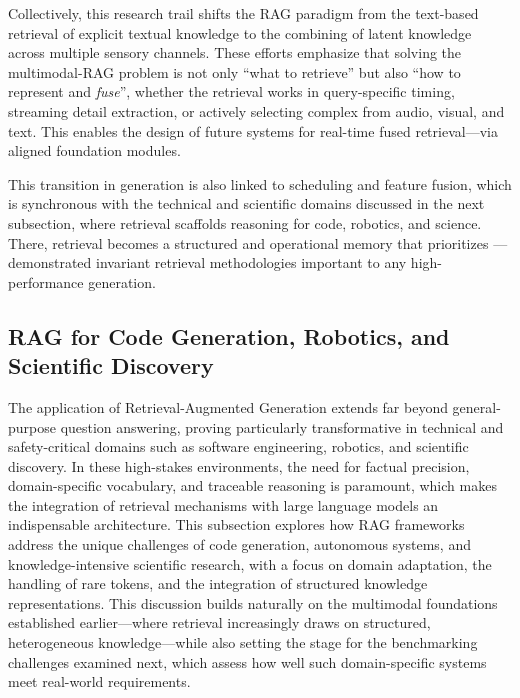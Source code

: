 \documentclass[11pt]{article}
\begin{document}
Collectively, this research trail shifts the RAG paradigm from the text-based retrieval of explicit textual knowledge to the combining of latent knowledge across multiple sensory channels. These efforts emphasize that solving the multimodal-RAG problem is not only ``what to retrieve'' but also ``how to represent and \emph{fuse}'', whether the retrieval works in query-specific timing, streaming detail extraction, or actively selecting complex from audio, visual, and text. This enables the design of future systems for real-time fused retrieval---via aligned foundation modules.

This transition in generation is also linked to scheduling and feature fusion, which is synchronous with the technical and scientific domains discussed in the next subsection, where retrieval scaffolds reasoning for code, robotics, and science. There, retrieval becomes a structured and operational memory that prioritizes --- demonstrated invariant retrieval methodologies important to any high-performance generation.

\subsection{RAG for Code Generation, Robotics, and Scientific Discovery}

The application of Retrieval-Augmented Generation extends far beyond general-purpose question answering, proving particularly transformative in technical and safety-critical domains such as software engineering, robotics, and scientific discovery. In these high-stakes environments, the need for factual precision, domain-specific vocabulary, and traceable reasoning is paramount, which makes the integration of retrieval mechanisms with large language models an indispensable architecture. This subsection explores how RAG frameworks address the unique challenges of code generation, autonomous systems, and knowledge-intensive scientific research, with a focus on domain adaptation, the handling of rare tokens, and the integration of structured knowledge representations. This discussion builds naturally on the multimodal foundations established earlier---where retrieval increasingly draws on structured, heterogeneous knowledge---while also setting the stage for the benchmarking challenges examined next, which assess how well such domain-specific systems meet real-world requirements.
\end{document}
